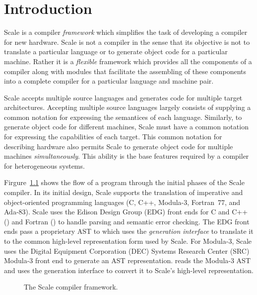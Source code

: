 
\chapter{Introduction}\label{chap:intro}

Scale is a compiler \emph{framework} which simplifies the task of
developing a compiler for new hardware.  Scale is not a compiler in
the sense that its objective is not to translate a particular language
or to generate object code for a particular machine.  Rather it is a
\emph{flexible} framework which provides all the components of a
compiler along with modules that facilitate the assembling of these
components into a complete compiler for a particular language and
machine pair.

Scale accepts multiple source languages and generates code for
multiple target architectures.  Accepting multiple source languages
largely consists of supplying a common notation for expressing the
semantices of each language.  Similarly, to generate object code for
different machines, Scale must have a common notation for expressing
the capabilities of each target.  This common notation for describing
hardware also permits Scale to generate object code for multiple
machines \emph{simultaneously}.  This ability is the base features
required by a compiler for heterogeneous systems.

Firgure~\ref{fig:scaleFlow} shows the flow of a program through the
initial phases of the Scale compiler.  In its initial design, Scale
supports the translation of imperative and object-oriented programming
languages (\ie C, C++, Modula-3, Fortran~77, and Ada-83).  Scale uses
the Edison Design Group (EDG) front ends for C and C++
() and Fortran () to handle parsing and
semantic error checking.  The EDG front ends pass a proprietary AST to
 which uses the \emph{generation interface} to 
translate it to the common high-level representation form used by
Scale.  For Modula-3, Scale uses the Digital Equipment Corporation
(DEC) Systems Research Center (SRC) Modula-3 front end to generate an
AST representation.   reads the Modula-3 AST and uses
the generation interface to convert it to Scale's high-level
representation.

\begin{figure}
  \centering
\caption{\label{fig:scaleFlow} The Scale compiler framework.}
\end{figure}

